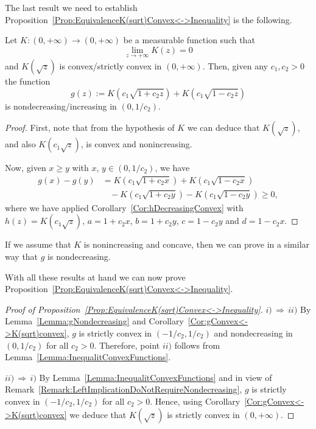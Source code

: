 The last result we need to establish Proposition~\ref{Prop:EquivalenceK(sqrt)Convex<->Inequality} is the following.

\begin{lemma}
\label{Lemma:gNondecreasing}
Let $K:(0,+\infty) \to (0,+\infty)$ be a measurable function such that
$$ \lim_{z\to+\infty} K(z) = 0 $$
and $ K(\sqrt{z}) $ is convex/strictly convex in $(0,+\infty)$. Then, given any $c_1,c_2>0$ the
function
$$
g(z) := K(c_1 \sqrt{1 + c_2 z}) +  K(c_1 \sqrt{1 - c_2 z})
$$
is nondecreasing/increasing in $(0, 1/c_2)$.
\end{lemma}

\begin{proof}
First, note that from the hypothesis of $K$ we can deduce that $K(\sqrt{z})$, and also
$K(c_1\sqrt{z})$, is convex and nonincreasing.

Now, given $x\geq y$ with $x$, $y\in (0,1/c_2)$, we have
\begin{align*}
g(x)-g(y) &= K(c_1\sqrt{1+c_2 x}) + K(c_1\sqrt{1-c_2 x}) \\
&\ \ \ \ - K(c_1\sqrt{1+c_2 y}) -K(c_1\sqrt{1-c_2 y}) \geq 0,
\end{align*}
where we have applied Corollary~\ref{Cor:hDecreasingConvex} with $h(z) = K(c_1\sqrt{z})$,
$a=1+c_2x$, $b=1+c_2y$, $c=1-c_2y$ and $d=1-c_2x$.
\end{proof}

\begin{remark}
	\label{Remark:Concavity}
If we assume that $K$ is nonincreasing and concave, then we can prove in a similar way that $g$ is
nondecreasing.
\end{remark}

With all these results at hand we can now prove Proposition~\ref{Prop:EquivalenceK(sqrt)Convex<->Inequality}.

\begin{proof}[Proof of Proposition~\ref{Prop:EquivalenceK(sqrt)Convex<->Inequality}]
$i)\, \Rightarrow \,ii)$ By Lemma~\ref{Lemma:gNondecreasing} and
Corollary~\ref{Cor:gConvex<->K(sqrt)convex}, $g$ is strictly convex in
$(-1/c_2,1/c_2)$ and nondecreasing in $(0,1/c_2)$ for all $c_2>0$. Therefore, point $ii)$ follows from
Lemma~\ref{Lemma:InequalitConvexFunctions}.

$ii)\, \Rightarrow \,i)$ By Lemma~\ref{Lemma:InequalitConvexFunctions} and in view of
Remark~\ref{Remark:LeftImplicationDoNotRequireNondecreasing}, $g$ is strictly convex in
$(-1/c_2,1/c_2)$ for all $c_2>0$. Hence, using Corollary~\ref{Cor:gConvex<->K(sqrt)convex} we deduce
that $K(\sqrt{z})$ is strictly convex in $(0, +\infty)$.
\end{proof}


